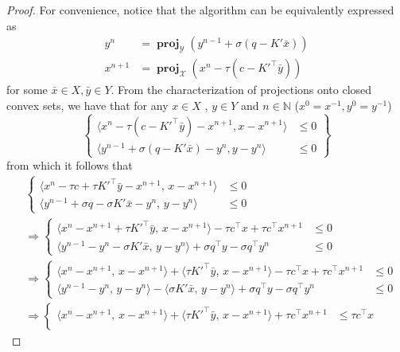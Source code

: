 \documentclass[twoside,12pt,openright]{report}  %
\DeclareMathOperator*{\proj}{\textbf{proj}}
\begin{document}
\begin{proof}
    For convenience, notice that the algorithm can be equivalently expressed as
    \begin{align*}
        y^{n} &= \proj_{\mathcal{Y}}(y^{n-1} + \sigma(q-K'\bar{x}))\\
        x^{n+1} &= \proj_{\mathcal{X}}(x^n-\tau(c-K'^\top \bar{y}))
    \end{align*}
    for some $\bar{x} \in X, \bar{y}\in Y$.
    From the characterization of projections onto closed convex sets, we have that for any $x \in X$ , $y \in Y$ and \(n \in \mathbb{N}\) (\(x^0=x^{-1},y^0=y^{-1}\))
    \[
\left\{
\begin{aligned}
    \langle x^n-\tau(c-K'^\top \bar{y})-x^{n+1}, x -x^{n+1}\rangle &\leq 0 \\
    \langle y^{n-1}+\sigma(q-K'\bar{x})-y^{n}, y -y^{n}\rangle &\leq 0
\end{aligned}
\right\}
\]
    from which it follows that     
\[
\begin{aligned}
&\left\{
\begin{aligned}
\langle x^n - \tau c + \tau K'^\top \bar{y} - x^{n+1},\, x - x^{n+1} \rangle &\leq 0 \\
\langle y^{n-1} + \sigma q - \sigma K' \bar{x} - y^{n},\, y - y^{n} \rangle &\leq 0
\end{aligned}
\right. \\[1ex]
&\Rightarrow
\left\{
\begin{aligned}
\langle x^n - x^{n+1} + \tau K'^\top \bar{y},\, x - x^{n+1} \rangle - \tau c^\top x + \tau c^\top x^{n+1} &\leq 0 \\
\langle y^{n-1} - y^{n} - \sigma K' \bar{x},\, y - y^{n} \rangle + \sigma q^\top y - \sigma q^\top y^{n} &\leq 0
\end{aligned}
\right. \\[1ex]
&\Rightarrow
\left\{
\begin{aligned}
\langle x^n - x^{n+1},\, x - x^{n+1} \rangle + \langle \tau K'^\top \bar{y},\, x - x^{n+1} \rangle - \tau c^\top x + \tau c^\top x^{n+1} &\leq 0 \\
\langle y^{n-1} - y^{n},\, y - y^{n} \rangle - \langle \sigma K' \bar{x},\, y - y^{n} \rangle + \sigma q^\top y - \sigma q^\top y^{n} &\leq 0
\end{aligned}
\right. \\[1ex]
&\Rightarrow
\left\{
\begin{aligned}
\langle x^n - x^{n+1},\, x - x^{n+1} \rangle + \langle \tau K'^\top \bar{y},\, x - x^{n+1} \rangle + \tau c^\top x^{n+1} &\leq \tau c^\top x \\

\end{aligned}
\end{aligned}\]
\end{proof}
\end{document}
